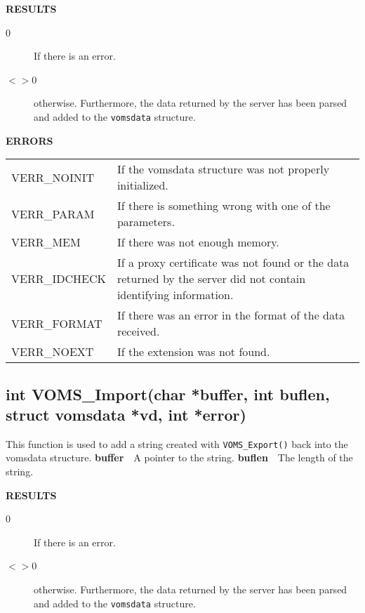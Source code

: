\documentclass[a4paper]{book}
\newcommand{\errors}{\noindent \textbf{ERRORS}\newline}
\newcommand{\result}{\noindent \textbf{RESULTS}\newline}
\newcommand{\parameter}[1]{\newline\textbf{#1}\ \ }
\begin{document}
\result
\begin{description}
\item[0] If there is an error.
\item[$<>$0] otherwise.  Furthermore, the data returned by the server
  has been parsed and added to the \verb|vomsdata| structure.
\end{description}

\errors
\bigskip\begin{tabular}{lp{3in}}
VERR\_NOINIT   & If the vomsdata structure was not properly
initialized.\\
VERR\_PARAM    & If there is something wrong with one of the parameters.\\
VERR\_MEM      & If there was not enough memory.\\
VERR\_IDCHECK  & If a proxy certificate was not found or the data
returned by the server did not contain identifying information.\\
VERR\_FORMAT   & If there was an error in the format of the data
received.\\
VERR\_NOEXT    & If the extension was not found.\\
\end{tabular}


\subsection{int VOMS\_Import(char *buffer, int buflen, struct vomsdata *vd, int *error)}

This function is used to add a string created with
\verb|VOMS_Export()| back into the vomsdata structure.
\parameter{buffer}{A pointer to the string.}
\parameter{buflen}{The length of the string.}

\result
\begin{description}
\item[0] If there is an error.
\item[$<>$0] otherwise.  Furthermore, the data returned by the server
  has been parsed and added to the \verb|vomsdata| structure.
\end{description}
\end{document}
